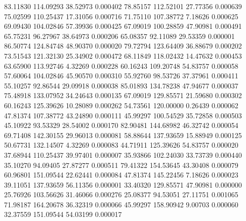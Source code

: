        83.11830      114.09293       38.52973       0.000402
       78.85157      112.52101       27.77356       0.000639
       75.02599      110.25437       17.31056       0.000716
       71.75110      107.38772        7.18626       0.000625
       69.09430      104.02846       57.39936       0.000425
       67.09019      100.28859       47.90981       0.000491
       65.75231       96.27967       38.64973       0.000206
       65.08357       92.11089       29.53359       0.000001
       86.50774      124.84748       48.90370       0.000020
       79.72794      123.64409       36.88679       0.000202
       73.51543      121.32130       25.34902       0.000472
       68.11849      118.02432       14.47632       0.000453
       63.65900      113.92746        4.32269       0.000228
       60.16243      109.20748       54.83757       0.000058
       57.60064      104.02846       45.90570       0.000310
       55.92760       98.53726       37.37961       0.000411
       55.10257       92.86544       29.09918       0.000038
       85.01893      134.78238       47.94677       0.000037
       75.48918      133.07952       34.24643       0.000135
       67.09019      129.85571       21.59680       0.000302
       60.16243      125.39626       10.28089       0.000262
       54.73561      120.00000        0.26439       0.000062
       47.81374      107.38772       43.24890       0.000111
       45.99297      100.54529       35.72858       0.000503
       45.10922       93.53329       28.54002       0.000170
       82.90481      144.68982       46.32742       0.000054
       69.71408      142.30155       29.96013       0.000081
       58.88644      137.93659       15.88949       0.000125
       50.67731      132.14507        4.32269       0.000083
       44.71911      125.39626       54.83757       0.000020
       37.68944      110.25437       39.97401       0.000007
       35.93866      102.24030       33.73739       0.000440
       35.10270       94.09405       27.87277       0.000511
       79.41322      154.53645       43.30408       0.000079
       60.96801      151.09544       22.62441       0.000084
       47.81374      145.22456        7.18626       0.000023
       39.11051      137.93659       56.11356       0.000001
       33.40320      129.85571       47.90981       0.000000
       25.76926      103.56626       31.46066       0.000276
       25.08377       94.53051       27.11751       0.001065
       71.98187      164.20678       36.32319       0.000066
       45.99297      158.90942        9.00703       0.000060
       32.37559      151.09544       54.03199       0.000017
